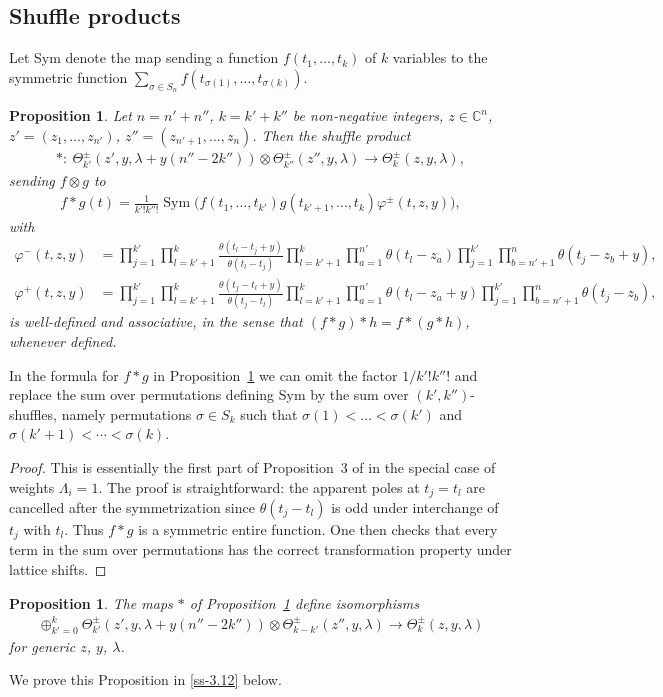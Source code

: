\documentclass[pdftex]{sigma}
\numberwithin{equation}{section}
\newtheorem{Proposition}[Theorem]{Proposition}
 { \theoremstyle{definition}
\newtheorem{Definition}[Theorem]{Definition}
\newtheorem{Example}[Theorem]{Example}
\newtheorem{Remark}[Theorem]{Remark} }
\begin{document}
\subsection{Shuffle products}\label{ss-3.2}
Let Sym denote the map sending a function $f(t_1,\dots,t_k)$ of $k$ variables to the symmetric function $\sum\limits_{\sigma\in S_n}f(t_{\sigma(1)},\dots,t_{\sigma(k)})$.
\begin{Proposition}\label{prop-0} Let $n=n'+n''$, $k=k'+k''$ be non-negative integers, $z\in\mathbb C^n$, $z'=(z_1,\dots,z_{n'})$, $z''=(z_{n'+1},\dots, z_n)$. Then the shuffle product
 \begin{gather*}
 *\colon \ \Theta^\pm_{k'}(z',y,\lambda+y(n''-2k''))\otimes \Theta^\pm_{k''}(z'',y,\lambda)\to\Theta^\pm_k(z,y,\lambda),
 \end{gather*}
 sending $f\otimes g$ to
 \begin{gather*}
 f*g(t)=\frac1{k'!k''!} \operatorname{Sym}\big(f(t_1,\dots,t_{k'}) g(t_{k'+1},\dots,t_k)\varphi^\pm(t,z,y)\big),
 \end{gather*}
 with
 \begin{align*}
 \varphi^-(t,z,y)&=\prod_{j=1}^{k'} \prod_{l=k'+1}^k \frac{\theta(t_l-t_j+y)} {\theta(t_l-t_j)} \prod_{l=k'+1}^k\prod_{a=1}^{n'}\theta(t_l-z_a) \prod_{j=1}^{k'}\prod_{b=n'+1}^n\theta(t_j-z_b+y), \\
 \varphi^+(t,z,y)&=\prod_{j=1}^{k'} \prod_{l=k'+1}^k \frac{\theta(t_j-t_l+y)}{\theta(t_j-t_l)} \prod_{l=k'+1}^k\prod_{a=1}^{n'}\theta(t_l-z_a+y) \prod_{j=1}^{k'}\prod_{b=n'+1}^n\theta(t_j-z_b),
 \end{align*}
 is well-defined and associative, in the sense that $(f*g)*h=f*(g*h)$, whenever defined.
\end{Proposition}
\begin{Remark}\label{remark-3} In the formula for $f*g$ in Proposition~\ref{prop-0} we can omit the factor $1/k'!k''!$ and replace the sum over permutations defining Sym by the sum over $(k',k'')$-shuffles, namely permutations $\sigma\in S_{k}$ such that $\sigma(1)<\dots<\sigma(k')$ and $\sigma(k'+1)<\cdots<\sigma(k)$.
\end{Remark}
\begin{proof} This is essentially the first part of Proposition~3 of \cite{FelderTarasovVarchenko1997} in the special case of weights $\Lambda_i=1$. The proof is straightforward: the apparent poles at $t_j=t_l$ are cancelled after the symmetrization since $\theta(t_j-t_l)$ is odd under interchange of $t_j$ with $t_l$. Thus $f*g$ is a symmetric entire function. One then checks that every term in the sum over permutations has the correct transformation property under lattice shifts.
\end{proof}
\begin{Proposition}\label{prop-1} The maps $*$ of Proposition~{\rm \ref{prop-0}} define isomorphisms
 \begin{gather*}
 \oplus_{k'=0}^k \Theta^\pm_{k'}(z',y,\lambda+y(n''-2k'')) \otimes \Theta^\pm_{k-k'}(z'',y,\lambda) \to \Theta^\pm_k(z,y,\lambda)
 \end{gather*}
 for generic $z$, $y$, $\lambda$.
\end{Proposition}
We prove this Proposition in \ref{ss-3.12} below.
\end{document}
